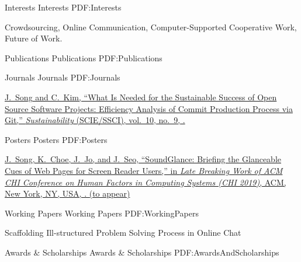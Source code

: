 \documentclass[letterpaper,MMMyyyy,nonstopmode]{simpleresumecv}
\begin{document}
\begin{Body}
    
\BigGap
\Section
{Interests}
{Interests}
{PDF:Interests}

\Entry
Crowdsourcing,
Online Communication,
Computer-Supported Cooperative Work,
Future of Work.



\BigGap
\Section
{Publications}
{Publications}
{PDF:Publications}

\SubSection
{Journals}
{Journals}
{PDF:Journals}

\begingroup
\renewcommand{\MaxNumberedItem}{[88]}

\BigGap
\NumberedItem{[1]}
\href{https://doi.org/10.3390/su10093001}
{\underline{J.~Song} and C.~Kim,
``What Is Needed for the Sustainable Success of Open Source Software Projects: Efficiency Analysis of Commit Production Process via Git,''
\textit{Sustainability} (SCIE/SSCI),
vol.~10,
no.~9,
.}

\endgroup

\BigGap
\SubSection
{Posters}
{Posters}
{PDF:Posters}

\begingroup
\renewcommand{\MaxNumberedItem}{[88]}

\BigGap
\NumberedItem{[1]}
\href{https://doi.org/10.1145/3290607.3312865}
{\underline{J.~Song}, K.~Choe, J.~Jo, and J.~Seo,
``SoundGlance: Briefing the Glanceable Cues of Web Pages for Screen Reader Users,''
in \textit{Late Breaking Work of ACM CHI Conference on Human Factors in Computing Systems (CHI 2019)},
ACM, New York, NY, USA,
. (to appear)}

\endgroup

\BigGap
\SubSection
{Working Papers}
{Working Papers}
{PDF:WorkingPapers}

\begingroup
\renewcommand{\MaxNumberedItem}{[88]}

\BigGap
\NumberedItem{[1]}
Scaffolding Ill-structured Problem Solving Process in Online Chat

\endgroup



\BigGap
\Section
{Awards \&\newline
Scholarships}
{Awards \& Scholarships}
{PDF:AwardsAndScholarships}


\end{Body}
\end{document}

